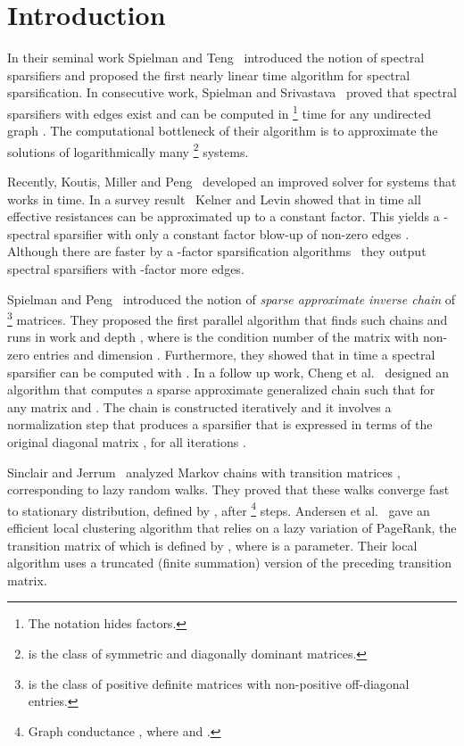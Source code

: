 \documentclass[11pt]{article}
\numberwithin{thm}{section}
\begin{document}
\newpage
\tableofcontents
\newpage



\section{Introduction\label{sec:Intro}}

In their seminal work Spielman and Teng~\cite{ST14} introduced the
notion of spectral sparsifiers and proposed the first nearly linear
time algorithm for spectral sparsification. In consecutive work, Spielman
and Srivastava~\cite{SS08} proved that spectral sparsifiers with
 edges exist and can be computed
in \footnote{The  notation hides  factors.} time for any undirected graph . The computational bottleneck of their algorithm is to approximate
the solutions of logarithmically many \footnote{ is the class of symmetric and diagonally dominant matrices.} systems.

Recently, Koutis, Miller and Peng~\cite{KMP11} developed
an improved solver for  systems that works in 
time. In a survey result~\cite[Theorem 3]{KL13} Kelner and Levin showed that in  time all effective resistances can be approximated up to a constant factor. This yields a -spectral sparsifier with only a constant factor blow-up of non-zero edges . Although there are faster by a -factor sparsification algorithms~\cite{KLP12} they output spectral sparsifiers with -factor more edges.

Spielman and Peng~\cite{PS14} introduced the notion of
\emph{sparse approximate inverse chain} of \footnote{ is the class of positive definite  matrices with non-positive off-diagonal entries.} matrices. They proposed the first parallel algorithm that finds such chains and runs in work  and depth , where 
is the condition number of the  matrix with  non-zero entries and dimension . Furthermore, they showed that in 
 time a spectral sparsifier 
can be computed with .
In a follow up work, Cheng et al.~\cite{CCLPT14} designed an algorithm that computes a sparse approximate generalized chain  such that
 for any  matrix  and . The chain  is constructed iteratively and it involves a normalization step that produces a sparsifier  that is expressed in terms of the original diagonal matrix , for all iterations .

Sinclair and Jerrum~\cite{SJ89} analyzed Markov chains with transition matrices , corresponding to lazy random walks. They proved that these walks converge fast to stationary distribution, defined by , after \footnote{Graph conductance , where  and . } steps. Andersen et al.~\cite{ACL06} gave an efficient local clustering algorithm that relies on a lazy variation of PageRank, the transition matrix of which is defined by , where  is a parameter. Their local algorithm uses a truncated (finite summation) version of the preceding transition matrix.
\end{document}
